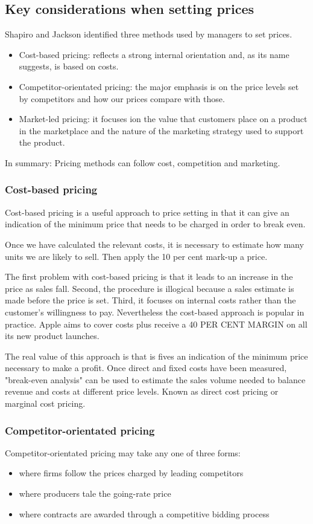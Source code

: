 \documentclass{article}
\begin{document}
\subsection{Key considerations when setting prices}
Shapiro and Jackson identified three methods used by managers to set prices. 

\begin{itemize}
    \item Cost-based pricing: reflects a strong internal orientation and, as its name suggests, is based on costs.
    \item Competitor-orientated pricing: the major emphasis is on the price levels set by competitors and how our prices compare with those.
    \item Market-led pricing: it focuses ion the value that customers place on a product in the marketplace and the nature of the marketing strategy used to support the product.
\end{itemize}

In summary: Pricing methods can follow cost, competition and marketing.

\subsubsection*{Cost-based pricing}
Cost-based pricing is a useful approach to price setting in that it can give an indication of the minimum price that needs to be charged in order to break even.

Once we have calculated the relevant costs, it is necessary to estimate how many units we are likely to sell. Then apply the 10 per cent mark-up a price.

The first problem with cost-based pricing is that it leads to an increase in the price as sales fall. Second, the procedure is illogical because a sales estimate is made before the price is set. Third, it focuses on internal costs rather than the customer's willingness to pay. Nevertheless the cost-based approach is popular in practice. Apple aims to cover costs plus receive a 40 PER CENT MARGIN on all its new product launches.

The real value of this approach is that is fives an indication of the minimum price necessary to make a profit. Once direct and fixed costs have been measured, "break-even analysis" can be used to estimate the sales volume needed to balance revenue and costs at different price levels. Known as direct cost pricing or marginal cost pricing.

\subsubsection*{Competitor-orientated pricing}
Competitor-orientated pricing may take any one of three forms:
\begin{itemize}
    \item where firms follow the prices charged by leading competitors
    \item where producers tale the going-rate price
    \item where contracts are awarded through a competitive bidding process
\end{itemize}
\end{document}
